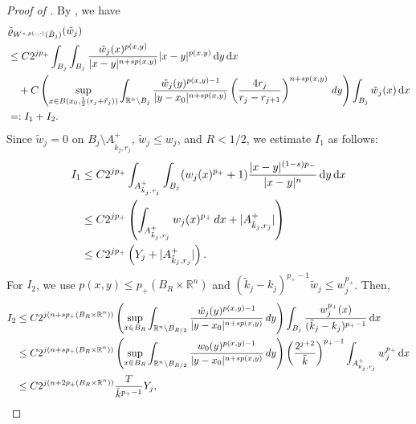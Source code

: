\documentclass[11pt]{amsart}
\theoremstyle{plain}
\theoremstyle{definition}
\numberwithin{equation}{section}
\renewcommand{\d}{\textnormal{d}}
\newcommand{\R}{\mathbb{R}}
\begin{document}
\begin{proof} [Proof of ]
By , we have
\begin{equation*}
\begin{split}
&\tilde{\varrho}_{W^{s, p(\cdot,\cdot)}(\tilde{B}_j)}(\tilde{w}_j) \\
&\leq C 2^{jp_+} \int_{B_j} \int_{B_j} \frac{\tilde{w}_j(x)^{p(x,y)}}{|x-y|^{n+sp(x,y)}} |x-y|^{p(x,y)} \,\mathrm{d}y \,\mathrm{d}x \\
&\quad + C \left( \sup_{x \in B(x_0,\frac{1}{2}(r_j+\tilde{r}_j))} \int_{\R^n \setminus B_j} \frac{\tilde{w}_j(y)^{p(x,y)-1}}{|y-x_0|^{n+sp(x,y)}} \left( \frac{4r_j}{r_j-r_{j+1}} \right)^{n+sp(x,y)} \, \d y \right) \int_{B_j} \tilde{w}_j(x) \,\mathrm{d}x \\
&=: I_1 + I_2.
\end{split}
\end{equation*}
Since $\tilde{w}_j = 0$ on $B_j \setminus A_{\tilde{k}_j, r_j}^+$, $\tilde{w}_j \leq w_j$, and $R < 1/2$, we estimate $I_1$ as follows:
\begin{equation*}
\begin{split}
I_1
&\leq C 2^{jp_+} \int_{A_{\tilde{k}_j, r_j}^+} \int_{B_j} (w_j(x)^{p_+}+1) \frac{|x-y|^{(1-s)p_-}}{|x-y|^n} \,\mathrm{d}y \,\mathrm{d}x \\
&\leq C 2^{jp_+} \left( \int_{A_{\tilde{k}_j, r_j}^+} w_j(x)^{p_+} \,\d x + |A_{\tilde{k}_j, r_j}^+| \right) \\
&\leq C 2^{jp_+} \left(Y_j + |A_{\tilde{k}_j, r_j}^+| \right).
\end{split}
\end{equation*}
For $I_2$, we use $p(x,y) \leq p_+(B_R \times \mathbb{R}^n)$ and $(\tilde{k}_j - k_j)^{p_+-1} \tilde{w}_j \leq w_j^{p_+}$. Then,
\begin{equation*}
\begin{split}
I_2
&\leq C 2^{j(n+sp_+(B_R\times\mathbb{R}^n))} \left( \sup_{x \in B_{R}} \int_{\R^n \setminus B_{R/2}} \frac{\tilde{w}_j(y)^{p(x,y)-1}}{|y-x_0|^{n+sp(x,y)}} \, \d y \right) \int_{B_j} \frac{w_j^{p_+}(x)}{(\tilde{k}_j-k_j)^{p_+ -1}} \,\mathrm{d}x \\
&\leq C 2^{j(n+sp_+(B_R \times \mathbb{R}^n))} \left( \sup_{x \in B_{R}} \int_{\R^n \setminus B_{R/2}} \frac{w_0(y)^{p(x,y)-1}}{|y-x_0|^{n+sp(x,y)}} \, \d y \right) \left( \frac{2^{j+2}}{\tilde{k}} \right)^{p_+-1} \int_{A_{k_j, r_j}^+} w_j^{p_+} \,\mathrm{d}x \\
&\leq C 2^{j(n+2p_+(B_R \times \mathbb{R}^n))} \frac{T}{\tilde{k}^{p_+-1}} Y_j,
\end{split}
\end{equation*}

\end{proof}
\end{document}
